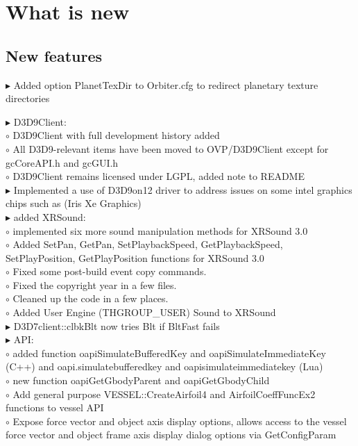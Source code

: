 \documentclass[Orbiter User Manual.tex]{subfiles}
\begin{document}
\section{What is new}

\subsection{New features}
$\blacktriangleright$ Added option PlanetTexDir to Orbiter.cfg to redirect planetary texture directories\\
\begin{sloppypar}%
$\blacktriangleright$ D3D9Client:\\
$\circ$ D3D9Client with full development history added\\
$\circ$ All D3D9-relevant items have been moved to OVP/D3D9Client except for gcCoreAPI.h and gcGUI.h\\
$\circ$ D3D9Client remains licensed under LGPL, added note to README\\
$\blacktriangleright$ Implemented a use of D3D9on12 driver to address issues on some intel graphics chips such as (Iris Xe Graphics)\\
$\blacktriangleright$ added XRSound:\\
$\circ$ implemented six more sound manipulation methods for XRSound 3.0\\
$\circ$ Added SetPan, GetPan, SetPlaybackSpeed, GetPlaybackSpeed, SetPlayPosition, GetPlayPosition functions for XRSound 3.0\\
$\circ$ Fixed some post-build event copy commands.\\
$\circ$ Fixed the copyright year in a few files.\\
$\circ$ Cleaned up the code in a few places.\\
$\circ$ Added User Engine (THGROUP\_USER) Sound to XRSound\\
$\blacktriangleright$ D3D7client::clbkBlt now tries Blt if BltFast fails\\
$\blacktriangleright$ API:\\
$\circ$ added function oapiSimulateBufferedKey and oapiSimulateImmediateKey (C++) and oapi.simulatebufferedkey and oapisimulateimmediatekey (Lua)\\
$\circ$ new function oapiGetGbodyParent and oapiGetGbodyChild\\
$\circ$ Add general purpose VESSEL::CreateAirfoil4 and AirfoilCoeffFuncEx2 functions to vessel API\\
$\circ$ Expose force vector and object axis display options, allows access to the vessel force vector and object frame axis display dialog options via GetConfigParam\\

\end{sloppypar}
\end{document}
